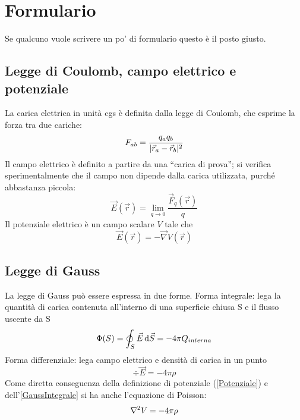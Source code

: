 \documentclass[../main.tex]{subfiles}
\begin{document}
\section{Formulario}
\setcounter{equation}{0}
\renewcommand{\theequation}{F.\arabic{equation}}

Se qualcuno vuole scrivere un po' di formulario questo è il posto giusto.

\subsection{Legge di Coulomb, campo elettrico e potenziale}\label{Preliminari}
La carica elettrica in unit\`a cgs \`e definita dalla legge di Coulomb, che esprime la forza tra due cariche:
\begin{equation}
	\label{Coulomb}
	F_{ab}=\frac{q_aq_b}{\lvert\vec r_a -\vec r_b\rvert^2}
\end{equation}
Il campo elettrico \`e definito a partire da una ``carica di prova''; si verifica sperimentalmente che il campo non dipende dalla carica utilizzata, purch\'e abbastanza piccola:
\begin{equation}
	\label{CampoElettrico}
	\vec E(\vec r)=\lim_{q \to 0} \frac{\vec F_q(\vec r)}{q}
\end{equation}
Il potenziale elettrico \`e un campo scalare $V$ tale che
\begin{equation}
	\label{Potenziale}
	\vec E(\vec r) = - \vec \nabla V(\vec r)
\end{equation}

\subsection{Legge di Gauss}\label{Gauss}
La legge di Gauss pu\`o essere espressa in due forme.\newline
Forma integrale: lega la quantit\`a di carica contenuta all'interno di una superficie chiusa S e il flusso uscente da S
\begin{equation}
	\label{GaussIntegrale}
	\Phi(S)= \oint_S \vec E \,\mathrm d \vec S=-4\pi Q_{interna}
\end{equation}
Forma differenziale: lega campo elettrico e densit\`a di carica in un punto 
\begin{equation}
	\label{GaussDifferenziale}
	\div \vec E=-4\pi\rho
\end{equation}
Come diretta conseguenza della definizione di potenziale (\cref{Potenziale}) e dell'\cref{GaussIntegrale} si ha anche l'equazione di Poisson:
\begin{equation}
	\label{Poisson}
	\nabla^2 V= -4\pi \rho
\end{equation}
\end{document}
